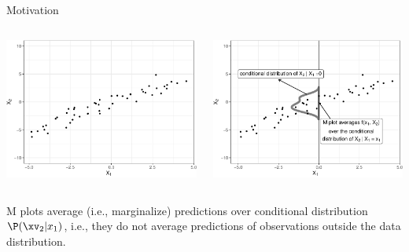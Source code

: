\documentclass[11pt,compress,t,notes=noshow, aspectratio=169, xcolor=table]{beamer}
\begin{document}
\begin{frame}{Motivation}

\begin{columns}[T]
\begin{column}{0.5\textwidth}
\centering
\includegraphics[width=\textwidth]{figure/ale_scatter}
\end{column}
\begin{column}{0.5\textwidth}
\centering
\includegraphics[width=\textwidth]{figure/ale_mplot}
\end{column}
\end{columns}

M plots average (i.e., marginalize) predictions over conditional distribution $\P(\xv_2|x_1)$, i.e., they do not average predictions of observations outside the data distribution.


\end{frame}
\end{document}
